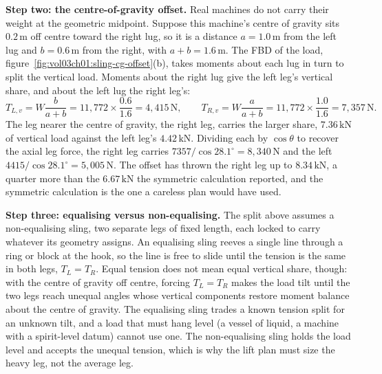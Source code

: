 

\textbf{Step two: the centre-of-gravity offset.} Real machines do not carry
their weight at the geometric midpoint. Suppose this machine's centre of
gravity sits $0.2\,\si{\meter}$ off centre toward the right lug, so it is a
distance $a = 1.0\,\si{\meter}$ from the left lug and $b = 0.6\,\si{\meter}$
from the right, with $a + b = 1.6\,\si{\meter}$. The FBD of the load,
figure~\ref{fig:vol03ch01:sling-cg-offset}(b), takes moments about each lug
in turn to split the vertical load. Moments about the right lug give the
left leg's vertical share, and about the left lug the right leg's:
\[
T_{L,v} = W\frac{b}{a+b} = 11{,}772 \times \frac{0.6}{1.6} = 4{,}415\,\text{N},
\qquad
T_{R,v} = W\frac{a}{a+b} = 11{,}772 \times \frac{1.0}{1.6} = 7{,}357\,\text{N}.
\]
The leg nearer the centre of gravity, the right leg, carries the larger
share, $7.36\,\text{kN}$ of vertical load against the left leg's $4.42\,
\text{kN}$. Dividing each by $\cos\theta$ to recover the axial leg force, the
right leg carries $7357/\cos 28.1^{\circ} = 8{,}340\,\text{N}$ and the left
$4415/\cos 28.1^{\circ} = 5{,}005\,\text{N}$. The offset has thrown the
right leg up to $8.34\,\text{kN}$, a quarter more than the $6.67\,\text{kN}$
the symmetric calculation reported, and the symmetric calculation is the one
a careless plan would have used.

\textbf{Step three: equalising versus non-equalising.} The split above
assumes a non-equalising sling, two separate legs of fixed length, each
locked to carry whatever its geometry assigns. An equalising sling reeves a
single line through a ring or block at the hook, so the line is free to slide
until the tension is the same in both legs, $T_L = T_R$. Equal tension does
not mean equal vertical share, though: with the centre of gravity off centre,
forcing $T_L = T_R$ makes the load tilt until the two legs reach unequal
angles whose vertical components restore moment balance about the centre of
gravity. The equalising sling trades a known tension split for an unknown
tilt, and a load that must hang level (a vessel of liquid, a machine with a
spirit-level datum) cannot use one. The non-equalising sling holds the load
level and accepts the unequal tension, which is why the lift plan must size
the heavy leg, not the average leg.

